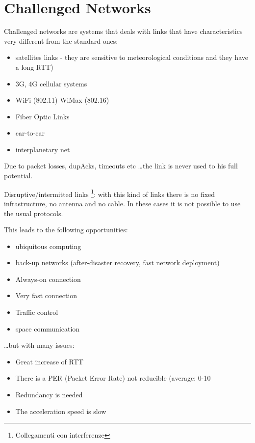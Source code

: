 \section{Challenged Networks}

Challenged networks are systems that deals with links that have
characteristics very different from the standard ones:

\begin{itemize}
  \item satellites links - they are sensitive to meteorological conditions
and they have a long RTT)
  \item 3G, 4G cellular systems
  \item WiFi (802.11) WiMax (802.16)
  \item Fiber Optic Links
  \item car-to-car
  \item interplanetary net
\end{itemize}

Due to packet losses, dupAcks, timeouts etc \dots the link is never used
to his full potential.

Disruptive/intermitted links \footnote{Collegamenti con interferenze}: with
this kind of links there is no fixed infrastructure, no antenna and no cable.
In these cases it is not possible to use the usual protocols.

This leads to the following opportunities:
\begin{itemize}
  \item ubiquitous computing
  \item back-up networks (after-disaster recovery, fast network deployment)
  \item Always-on connection
  \item Very fast connection
  \item Traffic control
  \item space communication
\end{itemize}

\dots but with many issues:

\begin{itemize}
  \item Great increase of RTT
  \item There is a PER (Packet Error Rate) not reducible (average: 0-10%
  \item Redundancy is needed
  \item The acceleration speed is slow
\end{itemize}

